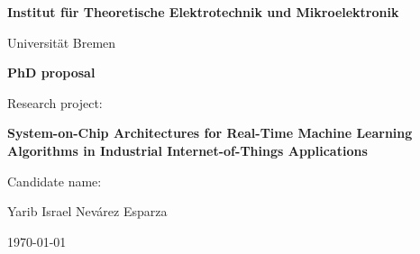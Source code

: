 
\begin{center}
\textbf{Institut f\"ur Theoretische Elektrotechnik und Mikroelektronik}
\vspace{5mm}

{\large Universit\"at Bremen}
\vspace{20mm}

\textbf{\Large PhD proposal}
\vspace{40mm}





Research project:

\textbf{System-on-Chip Architectures for Real-Time Machine Learning Algorithms in Industrial Internet-of-Things Applications}

\vspace{40mm}

Candidate name:

Yarib Israel Nev\'arez Esparza
\vspace{20mm}

\today

\end{center}


\pagebreak
